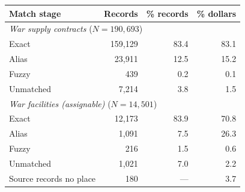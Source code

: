 \begin{tabular}{lrrr}
\toprule
Match stage & Records & \% records & \% dollars \\
\midrule
\multicolumn{4}{l}{\emph{War supply contracts} ($N=190,693$)} \\
\quad Exact & 159,129 & 83.4 & 83.1 \\
\quad Alias & 23,911 & 12.5 & 15.2 \\
\quad Fuzzy & 439 & 0.2 & 0.1 \\
\quad Unmatched & 7,214 & 3.8 & 1.5 \\
\multicolumn{4}{l}{\emph{War facilities (assignable)} ($N=14,501$)} \\
\quad Exact & 12,173 & 83.9 & 70.8 \\
\quad Alias & 1,091 & 7.5 & 26.3 \\
\quad Fuzzy & 216 & 1.5 & 0.6 \\
\quad Unmatched & 1,021 & 7.0 & 2.2 \\
\quad Source records no place & 180 & --- & 3.7 \\
\bottomrule
\end{tabular}